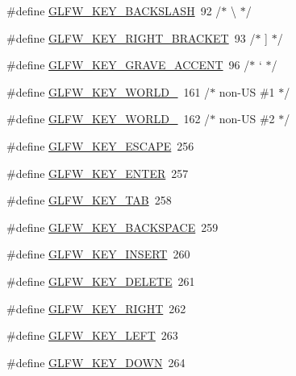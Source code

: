 \begin{DoxyCompactItemize}
\item 
\#define \hyperlink{group__keys_gab8155ea99d1ab27ff56f24f8dc73f8d1}{G\-L\-F\-W\-\_\-\-K\-E\-Y\-\_\-\-B\-A\-C\-K\-S\-L\-A\-S\-H}~92  /$\ast$ \textbackslash{} $\ast$/
\item 
\#define \hyperlink{group__keys_ga86ef225fd6a66404caae71044cdd58d8}{G\-L\-F\-W\-\_\-\-K\-E\-Y\-\_\-\-R\-I\-G\-H\-T\-\_\-\-B\-R\-A\-C\-K\-E\-T}~93  /$\ast$ \mbox{]} $\ast$/
\item 
\#define \hyperlink{group__keys_ga7a3701fb4e2a0b136ff4b568c3c8d668}{G\-L\-F\-W\-\_\-\-K\-E\-Y\-\_\-\-G\-R\-A\-V\-E\-\_\-\-A\-C\-C\-E\-N\-T}~96  /$\ast$ ` $\ast$/
\item 
\#define \hyperlink{group__keys_gadc78dad3dab76bcd4b5c20114052577a}{G\-L\-F\-W\-\_\-\-K\-E\-Y\-\_\-\-W\-O\-R\-L\-D\-\_}~161 /$\ast$ non-\/U\-S \#1 $\ast$/
\item 
\#define \hyperlink{group__keys_ga20494bfebf0bb4fc9503afca18ab2c5e}{G\-L\-F\-W\-\_\-\-K\-E\-Y\-\_\-\-W\-O\-R\-L\-D\-\_}~162 /$\ast$ non-\/U\-S \#2 $\ast$/
\item 
\#define \hyperlink{group__keys_gaac6596c350b635c245113b81c2123b93}{G\-L\-F\-W\-\_\-\-K\-E\-Y\-\_\-\-E\-S\-C\-A\-P\-E}~256
\item 
\#define \hyperlink{group__keys_ga9555a92ecbecdbc1f3435219c571d667}{G\-L\-F\-W\-\_\-\-K\-E\-Y\-\_\-\-E\-N\-T\-E\-R}~257
\item 
\#define \hyperlink{group__keys_ga6908a4bda9950a3e2b73f794bbe985df}{G\-L\-F\-W\-\_\-\-K\-E\-Y\-\_\-\-T\-A\-B}~258
\item 
\#define \hyperlink{group__keys_ga6c0df1fe2f156bbd5a98c66d76ff3635}{G\-L\-F\-W\-\_\-\-K\-E\-Y\-\_\-\-B\-A\-C\-K\-S\-P\-A\-C\-E}~259
\item 
\#define \hyperlink{group__keys_ga373ac7365435d6b0eb1068f470e34f47}{G\-L\-F\-W\-\_\-\-K\-E\-Y\-\_\-\-I\-N\-S\-E\-R\-T}~260
\item 
\#define \hyperlink{group__keys_gadb111e4df74b8a715f2c05dad58d2682}{G\-L\-F\-W\-\_\-\-K\-E\-Y\-\_\-\-D\-E\-L\-E\-T\-E}~261
\item 
\#define \hyperlink{group__keys_ga06ba07662e8c291a4a84535379ffc7ac}{G\-L\-F\-W\-\_\-\-K\-E\-Y\-\_\-\-R\-I\-G\-H\-T}~262
\item 
\#define \hyperlink{group__keys_gae12a010d33c309a67ab9460c51eb2462}{G\-L\-F\-W\-\_\-\-K\-E\-Y\-\_\-\-L\-E\-F\-T}~263
\item 
\#define \hyperlink{group__keys_gae2e3958c71595607416aa7bf082be2f9}{G\-L\-F\-W\-\_\-\-K\-E\-Y\-\_\-\-D\-O\-W\-N}~264
\item 

\end{DoxyCompactItemize}
